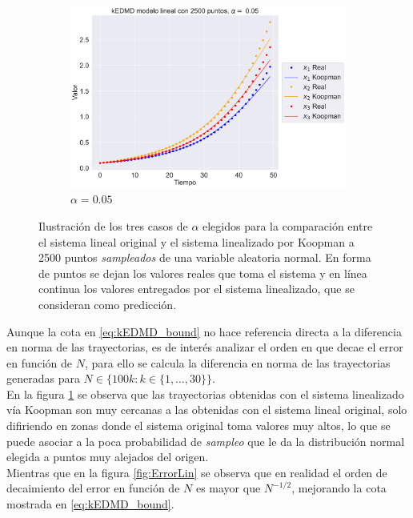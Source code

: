 \begin{figure}[htbp]
\begin{subfigure}[b]{0.32\textwidth}
        \includegraphics[width=\textwidth]{img/content/chapter3/Linear3.pdf}
        \caption{$\alpha=0.05$}
    \end{subfigure}
    \caption{Ilustración de los tres casos de $\alpha$ elegidos para la comparación entre el sistema lineal original y el sistema linealizado por Koopman a 2500 puntos \textit{sampleados} de una variable aleatoria normal. En forma de puntos se dejan los valores reales que toma el sistema y en línea continua los valores entregados por el sistema linealizado, que se consideran como predicción.}
    \label{fig:Comp_traj_lin}
\end{figure}
Aunque la cota en \eqref{eq:kEDMD_bound} no hace referencia directa a la diferencia en norma de las trayectorias, es de interés analizar el orden en que decae el error en función de $N$, para ello se calcula la diferencia en norma de las trayectorias generadas para $N \in \{ 100k : k \in \{1, \dots, 30\} \}$. \\
En la figura \ref{fig:Comp_traj_lin} se observa que las trayectorias obtenidas con el sistema linealizado vía Koopman son muy cercanas a las obtenidas con el sistema lineal original, solo difiriendo en zonas donde el sistema original toma valores muy altos, lo que se puede asociar a la poca probabilidad de \textit{sampleo} que le da la distribución normal elegida a puntos muy alejados del origen. \\
Mientras que en la figura \ref{fig:ErrorLin} se observa que en realidad el orden de decaimiento del error en función de $N$ es mayor que $N^{-1/2}$, mejorando la cota mostrada en \eqref{eq:kEDMD_bound}.
